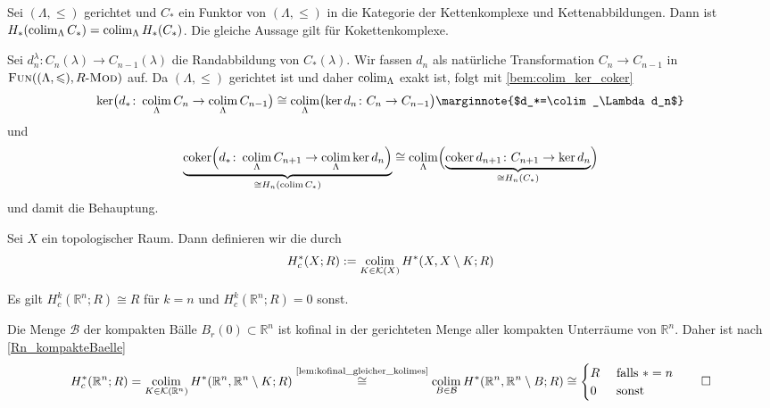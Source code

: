 \begin{korollar}[{name=[Homologie vertauscht mit Kolimiten]}]
	Sei $(\Lambda,\le)$ gerichtet und $C_*$ ein Funktor von $(\Lambda,\le)$ in die Kategorie der Kettenkomplexe und Kettenabbildungen. 
	Dann ist $H_*(\colim_\Lambda C_*) = \colim_\Lambda H_*(C_*)$. 
	Die gleiche Aussage gilt für Kokettenkomplexe.
\end{korollar}
\begin{beweis}
	Sei $d^{\lambda}_n \colon C_n(\lambda) \to C_{n-1}(\lambda)$ die Randabbildung von $C_*(\lambda)$.
	Wir fassen $d_n$ als natürliche Transformation $C_n \to C_{n-1}$ in $\FUN \enbrace*{(\Lambda,\le),R\text{-}\MOD}$ auf. 
	Da $(\Lambda,\le)$ gerichtet ist und daher $\colim_\Lambda$ exakt ist, folgt mit \autoref{bem:colim_ker_coker}
	\[
		\ker \enbrace[\big]{d_* \colon \colim_{\Lambda} C_n \to \colim_\Lambda C_{n-1}} \cong \colim_\Lambda \enbrace[\big]{\ker d_n \colon C_n \to C_{n-1} }\marginnote{$d_*=\colim_\Lambda d_n$}
	\]
	und 
	\[
		\Underbrace{\coker \enbrace[\Big]{ d_{*} \colon \colim_\Lambda C_{n+1} \to \colim_\Lambda \ker d_n}}{ \cong H_n(\colim C_*)}
		\cong \colim_\Lambda \enbrace[\Big]{ \Underbrace{\coker d_{n+1} \colon C_{n+1} \to \ker d_n}{\cong H_n(C_*)}}
	\]
	und damit die Behauptung.
\end{beweis}

\begin{definition}[{name=[singuläre Kohomologie mit kompaktem Träger]}]
	Sei $X$ ein topologischer Raum. Dann definieren wir die  durch
	\[
		H^*_c(X;R) := \colim_{K \in \mathcal{K}(X)} H^*(X,X \setminus K;R)
	\]
\end{definition}

\begin{beispiel}[{name=[Kohomologie mit kompaktem Träger des des euklidischen Raumes]}]
	Es gilt $H^k_c(\mathbb{R}^n;R) \cong R$ für $k=n$ und $H^k_c(\mathbb{R}^n;R)=0$ sonst. 
\end{beispiel}
\begin{beweis}
	Die Menge $\mathcal{B}$ der kompakten Bälle $B_r(0) \subset \mathbb{R}^n$ ist kofinal in der gerichteten Menge aller kompakten Unterräume von $\mathbb{R}^n$.
	Daher ist nach \autoref{Rn_kompakteBaelle}
	\[
		H^*_c(\mathbb{R}^n;R) = \colim_{K \in \mathcal{K}(\mathbb{R}^n)} H^* \enbrace*{\mathbb{R}^n , \mathbb{R}^n \setminus K;R} 
		\StackText{\ref{lem:kofinal_gleicher_kolimes}}{\cong} \colim_{B \in \mathcal{B}} H^* \enbrace*{\mathbb{R}^n,\mathbb{R}^n \setminus B;R} \cong \begin{cases}
			R &\text{ falls }*=n\\
			0 &\text{ sonst }
		\end{cases} \qedhere
	\]
\end{beweis}


